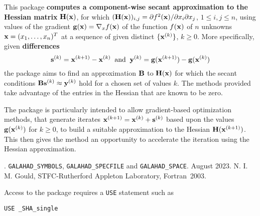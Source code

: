 \documentclass{galahad}
\newcommand{\packagename}{SHA}
\newcommand{\fullpackagename}{\libraryname\_\packagename}
\begin{document}
\galheader


\galsummary
This package 
{\bf computes a component-wise secant approximation to the Hessian matrix}
${\mathbf{H}}({\mathbf{x}})$, for which  
$({\mathbf{H}}({\mathbf{x}}))_{i,j} = \partial f^2 ({\mathbf{x}}) / \partial x_i \partial x_j$,
$1 \leq i, j \leq n$,  
using values of the gradient ${\mathbf{g}}({\mathbf{x}}) = \nabla_x f({\mathbf{x}})$ 
of the function $f({\mathbf{x}})$ of $n$ unknowns ${\mathbf{x}} = (x_1, \ldots, x_n)^T$
at a sequence of given distinct $\{{\mathbf{x}}^{(k)}\}$, $k \geq 0$.
More specifically, given {\bf differences}
\[ {\mathbf{s}}^{(k)} = {\mathbf{x}}^{(k+1)} - {\mathbf{x}}^{(k)} \;\;\mbox{and}\;\;
   {\mathbf{y}}^{(k)} = {\mathbf{g}}({\mathbf{x}}^{(k+1)}) - {\mathbf{g}}({\mathbf{x}}^{(k)})
\]
the package aims to find an approximation ${\mathbf{B}}$ to ${\mathbf{H}}({\mathbf{x}})$ for
which the secant conditions ${\mathbf{B}} {\mathbf{s}}^{(k)} \approx {\mathbf{y}}^{(k)}$ hold for
a chosen set of values $k$.
The methods provided take advantage of the entries in the Hessian that
are known to be zero.

The package is particularly intended to allow gradient-based
optimization methods, that generate iterates 
${\mathbf{x}}^{(k+1)} = {\mathbf{x}}^{(k)} + {\mathbf{s}}^{(k)}$ based upon the values ${\mathbf{g}}( {\mathbf{x}}^{(k)})$
for $k \geq 0$, to build a suitable approximation to the Hessian 
${\mathbf{H}}({\mathbf{x}}^{(k+1)})$. This then gives the method an opportunity to 
accelerate the iteration using the Hessian approximation.


\galattributes
\galversions{\tt  \fullpackagename\_single, \fullpackagename\_double}.
\galuses 
{\tt GALAHAD\_SY\-M\-BOLS}, 
{\tt GALAHAD\_SP\-ECFILE} and
{\tt GALAHAD\_SPACE}.
\galdate August 2023.
\galorigin N. I. M. Gould, STFC-Rutherford Appleton Laboratory,
\gallanguage Fortran~2003. 


\galhowto


Access to the package requires a {\tt USE} statement such as

\medskip{}

\hspace{8mm} {\tt USE \fullpackagename\_single}

\medskip{}
\end{document}

